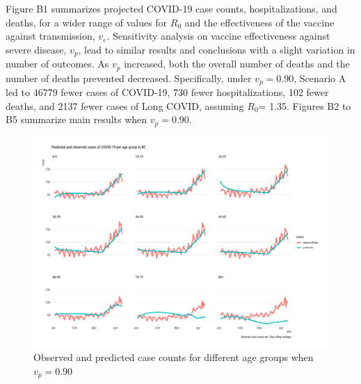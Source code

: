 \documentclass[]{elsarticle} %
\begin{document}
Figure B1 summarizes projected COVID-19 case counts, hospitalizations,
and deaths, for a wider range of values for \(R_0\) and the
effectiveness of the vaccine against transmission, \(v_e\). Sensitivity
analysis on vaccine effectiveness against severe disease, \(v_p\), lead
to similar results and conclusions with a slight variation in number of
outcomes. As \(v_p\) increased, both the overall number of deaths and
the number of deaths prevented decreased. Specifically, under
\(v_p=0.90\), Scenario A led to 46779 fewer cases of COVID-19, 730 fewer
hospitalizations, 102 fewer deaths, and 2137 fewer cases of Long COVID,
assuming \(R_0\)= 1.35. Figures B2 to B5 summarize main results when
\(v_p=0.90\).

\begin{figure}[htb]
\begin{center}
\includegraphics[width=6in]{"../figures/vp0.90/fig-validation.pdf"}
\caption{Observed and predicted case counts for different age groups when $v_p=0.90$}
\end{center}
\end{figure}
\end{document}
